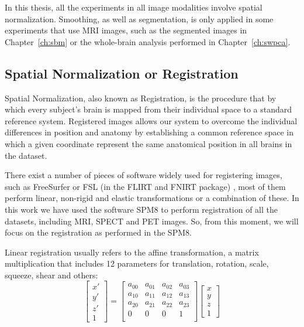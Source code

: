 In this thesis, all the experiments in all image modalities involve spatial normalization. Smoothing, as well as segmentation, is only applied in some experiments that use \ac{MRI} images, such as the segmented images in Chapter~\ref{ch:sbm} or the whole-brain analysis performed in Chapter~\ref{ch:swpca}. 

\subsection{Spatial Normalization or Registration}
Spatial Normalization, also known as Registration, is the procedure that by which every subject's brain is mapped from their individual space to a standard reference system. Registered images allows our system to overcome the individual differences in position and anatomy by establishing a common reference space in which a given coordinate represent the same anatomical position in all brains in the dataset. 

There exist a number of pieces of software widely used for registering images, such as FreeSurfer \cite{Reuter2010} or FSL (in the FLIRT and FNIRT package) \cite{Smith2004}, most of them perform linear, non-rigid and elastic transformations or a combination of these. In this work we have used the software SPM8 \cite{spm_book} to perform registration of all the datasets, including \ac{MRI}, \ac{SPECT} and \ac{PET} images. So, from this moment, we will focus on the registration as performed in the \ac{SPM8}. 

Linear registration usually refers to the affine transformation, a matrix multiplication that includes 12 parameters for translation, rotation, scale, squeeze, shear and others: 
\begin{equation}\label{eq:affine}
	\left[\begin{matrix}
	x'\\y'\\z'\\1
	\end{matrix}\right]
	 = \left[\begin{matrix}
	 a_{00} & a_{01} & a_{02} & a_{03}\\
	 a_{10} & a_{11} & a_{12} & a_{13}\\
	 a_{20} & a_{21} & a_{22} & a_{23}\\
	 0 & 0 & 0 & 1\\
	 \end{matrix}\right]
	 \left[\begin{matrix}
	 x\\y\\z\\1
	 \end{matrix}\right]
\end{equation}

